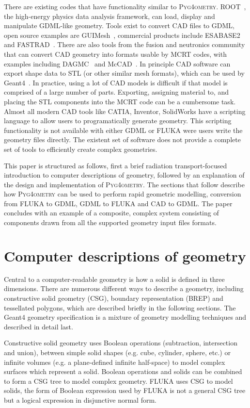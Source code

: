 \documentclass[final,5p,times,twocolumn]{elsarticle}
\newcommand{\PYGEOMETRY}{\textsc{Pyg4ometry}}
\begin{document}
There are existing codes that have functionality similar to \PYGEOMETRY{}. ROOT~\cite{Brun:1997pa}, the high-energy physics data analysis framework, 
can load, display and manipulate GDML-like geometry. Tools exist to convert CAD files to GDML, open source examples are GUIMesh~\cite{GUIMesh_Pinto}, commercial 
products include ESABASE2~\cite{ESABASE2} and FASTRAD~\cite{FASTRAD}. There are also tools from the fusion and neutronics community that can convert CAD 
geometry into formats usable by MCRT codes, with examples including DAGMC~\cite{DAGMC} and McCAD~\cite{McCad}. In principle CAD software can export shape data to STL 
(or other similar mesh formats), which can be used by Geant4~\cite{poole2012acad}. In practice, using a lot of CAD models is difficult if that model is comprised of a 
large number of parts. Exporting, assigning material to, and placing the STL components into the MCRT code can be a cumbersome task. Almost all modern CAD tools like 
CATIA, Inventor, SolidWorks have a scripting language to allow users to programatically generate geometry. This scripting functionality is not available with either 
GDML or FLUKA were users write the geometry files directly. The existent set of software does not provide a complete set of tools to efficiently create complex geometries.

This paper is structured as follows, first a brief radiation transport-focused introduction to computer descriptions of geometry, followed by an explanation of the design 
and implementation of \PYGEOMETRY{}. The sections that follow describe how \PYGEOMETRY{} can be used to perform rapid geometric modelling, conversion from 
FLUKA to GDML, GDML to FLUKA and CAD to GDML. The paper concludes with an example of a composite, complex system consisting of components drawn from 
all the supported  geometry input files formats.

\section{Computer descriptions of geometry} \label{sec:geometric}
Central to a computer-readable geometry is how a solid is defined in three dimensions. There are numerous different ways to describe a
geometry, including constructive solid geometry (CSG), boundary representation (BREP) and tessellated polygons, which are described 
briefly in the following sections.  The Geant4 geometry specification is a mixture of geometry modelling techniques and described in detail last.

Constructive solid geometry uses Boolean operations (subtraction, intersection and union), between simple solid shapes (e.g. cube, cylinder, sphere, etc.) or infinite
volumes (e.g. a plane-defined infinite half-space) to model complex surfaces which represent a solid. Boolean operations and solids can be combined to form a 
CSG tree to model complex geometry. FLUKA uses CSG to model solids, the form of Boolean expression used by FLUKA is not a general CSG tree but a 
logical expression in disjunctive normal form.
\end{document}
